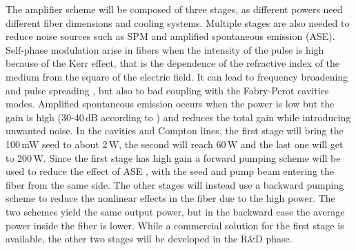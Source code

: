The amplifier scheme will be composed of three stages, as different powers need different fiber dimensions and cooling systems. Multiple stages are also needed to reduce noise sources such as SPM and amplified spontaneous emission (ASE). Self-phase modulation arise in fibers when the intensity of the pulse is high because of the Kerr effect, that is the dependence of the refractive index of the medium from the square of the electric field. It can lead to frequency broadening and pulse spreading \parencite{Stolen1978}, but also to bad coupling with the Fabry-Perot cavities modes. Amplified spontaneous emission occurs when the power is low but the gain is high (30-40\,dB according to \parencite{Paschotta1997}) and reduces the total gain while introducing unwanted noise. 
In the cavities and Compton lines, the first stage will bring the 100\,mW seed to about 2\,W, the second will reach 60\,W and the last one will get to 200\,W. Since the first stage has high gain a forward pumping scheme will be used to reduce the effect of ASE \parencite{Paschotta1997}, with the seed and pump beam entering the fiber from the same side. The other stages will instead use a backward pumping scheme to reduce the nonlinear effects in the fiber due to the high power. The two schemes yield the same output power, but in the backward case the average power inside the fiber is lower. While a commercial solution for the first stage is available, the other two stages will be developed in the R\&D phase.

